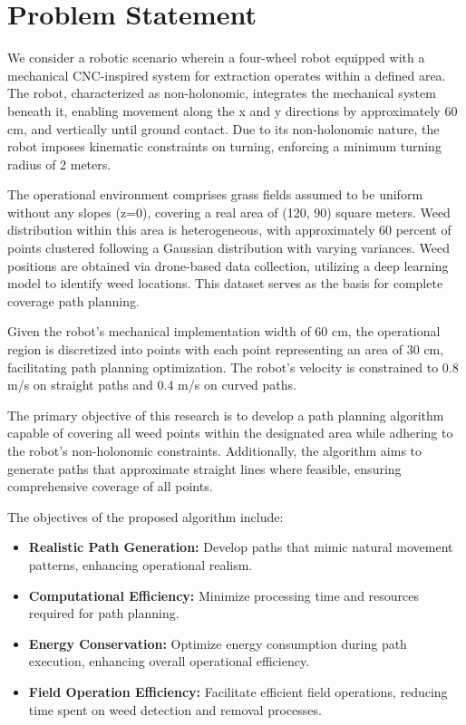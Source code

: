 \section{Problem Statement}

We consider a robotic scenario wherein a four-wheel robot equipped with a mechanical CNC-inspired system for extraction operates within a defined area. The robot, characterized as non-holonomic, integrates the mechanical system beneath it, enabling movement along the x and y directions by approximately 60 cm, and vertically until ground contact. Due to its non-holonomic nature, the robot imposes kinematic constraints on turning, enforcing a minimum turning radius of 2 meters.

\vspace*{6mm} 


The operational environment comprises grass fields assumed to be uniform without any slopes (z=0), covering a real area of (120, 90) square meters. Weed distribution within this area is heterogeneous, with approximately 60 percent of points clustered following a Gaussian distribution with varying variances. Weed positions are obtained via drone-based data collection, utilizing a deep learning model to identify weed locations. This dataset serves as the basis for complete coverage path planning.

\vspace*{6mm} 


Given the robot's mechanical implementation width of 60 cm, the operational region is discretized into points with each point representing an area of 30 cm, facilitating path planning optimization. The robot's velocity is constrained to 0.8 m/s on straight paths and 0.4 m/s on curved paths.

\vspace*{6mm} 


The primary objective of this research is to develop a path planning algorithm capable of covering all weed points within the designated area while adhering to the robot's non-holonomic constraints. Additionally, the algorithm aims to generate paths that approximate straight lines where feasible, ensuring comprehensive coverage of all points.

\vspace*{6mm} 

The objectives of the proposed algorithm include:

\begin{itemize}
    \item \textbf{Realistic Path Generation:} Develop paths that mimic natural movement patterns, enhancing operational realism.
    \item  \textbf{Computational Efficiency:} Minimize processing time and resources required for path planning.
    \item  \textbf{Energy Conservation:} Optimize energy consumption during path execution, enhancing overall operational efficiency.
    \item  \textbf{Field Operation Efficiency:} Facilitate efficient field operations, reducing time spent on weed detection and removal processes.
\end{itemize}

